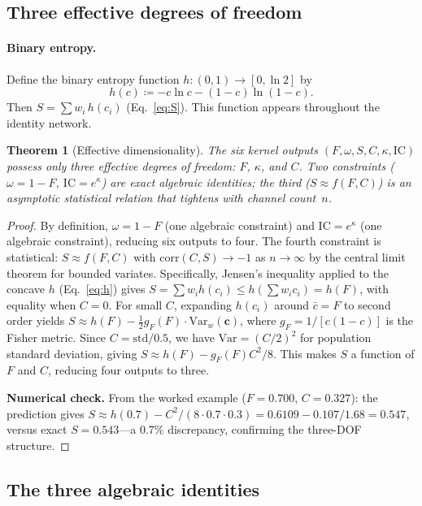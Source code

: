 \documentclass[
  aps,
  prd,
  twocolumn,
  superscriptaddress,
  nofootinbib,
  floatfix
]{revtex4-2}
\newtheorem{theorem}{Theorem}
\newcommand{\beq}{\begin{equation}}
\newcommand{\eeq}{\end{equation}}
\newcommand{\tvec}{\mathbf{c}}
\newcommand{\IC}{\mathrm{IC}}
\newcommand{\gF}{g_{\!F}}
\begin{document}
\subsection{Three effective degrees of freedom}

\paragraph{Binary entropy.}
Define the binary entropy function
$h: (0,1) \to [0, \ln 2]$ by
\beq
  h(c) \coloneqq -c\ln c - (1-c)\ln(1-c).
  \label{eq:h}
\eeq
Then $S = \sum w_i\, h(c_i)$
(Eq.~\ref{eq:S}).  This function appears throughout the
identity network.

\begin{theorem}[Effective dimensionality]
\label{thm:dof}
The six kernel outputs $(F, \omega, S, C, \kappa, \IC)$ possess
only three effective degrees of freedom: $F$, $\kappa$, and $C$.
Two constraints ($\omega = 1 - F$, $\IC = e^\kappa$) are exact
algebraic identities; the third ($S \approx f(F, C)$) is an
asymptotic statistical relation that tightens with channel
count~$n$.
\end{theorem}

\begin{proof}
By definition, $\omega = 1 - F$ (one algebraic constraint) and
$\IC = e^\kappa$ (one algebraic constraint), reducing six outputs
to four.  The fourth constraint is statistical:
$S \approx f(F, C)$ with $\mathrm{corr}(C, S) \to -1$ as
$n \to \infty$ by the central limit theorem for bounded variates.
Specifically, Jensen's inequality applied to the concave
$h$ (Eq.~\ref{eq:h}) gives $S = \sum w_i h(c_i) \leq h(\sum w_i c_i) = h(F)$,
with equality when $C = 0$.  For small $C$, expanding $h(c_i)$
around $\bar{c} = F$ to second order yields
$S \approx h(F) - \tfrac{1}{2}\gF(F) \cdot \mathrm{Var}_w(\tvec)$,
where $\gF = 1/[c(1{-}c)]$ is the Fisher metric.  Since
$C = \mathrm{std}/0.5$, we have $\mathrm{Var} = (C/2)^2$ for
population standard deviation, giving $S \approx h(F) - \gF(F) C^2/8$.
This makes $S$ a function of $F$ and $C$, reducing four outputs to
three.

\noindent\textbf{Numerical check.}  From the worked example
($F = 0.700$, $C = 0.327$): the
prediction gives $S \approx h(0.7) - C^2/(8 \cdot 0.7 \cdot 0.3)
= 0.6109 - 0.107/1.68 = 0.547$, versus exact $S = 0.543$---a
0.7\% discrepancy, confirming the three-DOF structure.
\end{proof}

\subsection{The three algebraic identities}
\end{document}
